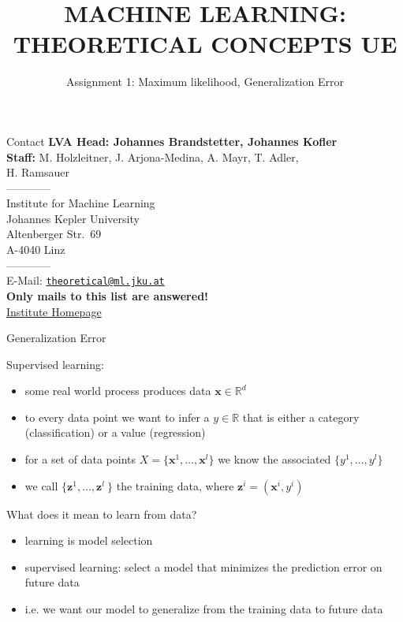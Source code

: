 \documentclass[xcolor=pdftex,dvipsnames,table]{beamer}
\title{MACHINE LEARNING: THEORETICAL CONCEPTS UE}
\subtitle{Assignment 1: Maximum likelihood, Generalization Error}
\institute{Institute for Machine Learning}
\date{}
\begin{document}
{ 
\begin{frame}
  \maketitle
\end{frame}
}


\begin{frame}{Contact}
\textbf{LVA Head: Johannes Brandstetter, Johannes Kofler }\\
\textbf{Staff:} M. Holzleitner, J. Arjona-Medina, A. Mayr, T. Adler, \\ H. Ramsauer \\ 
------------\\
Institute for Machine Learning\\
Johannes Kepler University\\
Altenberger Str.~69\\
A-4040 Linz\\
------------\\
E-Mail: \href{mailto:theoretical@ml.jku.at}{\tt theoretical@ml.jku.at}\\
\textbf{Only mails to this list are answered!} \\
\href{https://www.jku.at/en/institute-for-machine-learning/}{Institute Homepage}

\end{frame}


\begin{frame}{Generalization Error}
	\par
	\scriptsize
	\textcolor{NavyBlue}{Supervised learning:\\} 
	\begin{itemize}
		\item some real world process produces data  $\mathbf{x} \in \mathbb{R}^d$
		\item to every data point we want to infer a $y \in \mathbb{R}$ that is either a category (classification) or a value (regression)
		\item for a set of data points $X = \{\mathbf{x}^1, \ldots, \mathbf{x}^l\}$ we know the associated $\{y^1, \ldots, y^l\}$
		\item we call $\{ \mathbf{z}^1, \ldots, \mathbf{z}^l\ \}$ the training data, where $\mathbf{z}^i = (\mathbf{x}^i, y^i)$
	\end{itemize}
	
	\textcolor{NavyBlue}{What does it mean to learn from data? \\} 
	\begin{itemize}
		\item learning is model selection
		\item supervised learning: select a model that minimizes the prediction error on future data
		\item i.e. we want our model to generalize from the training data to future data
	\end{itemize}
\end{frame}
\end{document}
